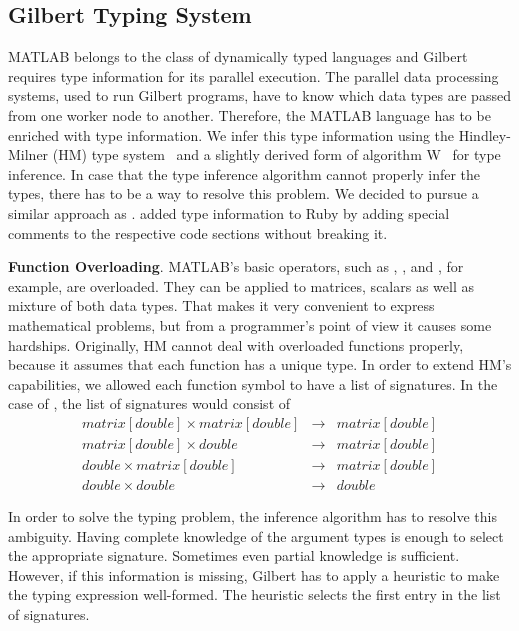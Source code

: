 \subsection{Gilbert Typing System}
\label{sec:gilberttyping}

MATLAB belongs to the class of dynamically typed languages and Gilbert requires type information for its parallel execution.
The parallel data processing systems, used to run Gilbert programs, have to know which data types are passed from one worker node to another.
Therefore, the MATLAB language has to be enriched with type information. We infer this type information using the Hindley-Milner (HM) type system~\cite{hindley:tams1969a,milner:jcss1978a} and a slightly derived form of algorithm W~\cite{damas:1982a} for type inference. In case that the type inference algorithm cannot properly infer the types, there has to be a way to resolve this problem. We decided to pursue a similar approach as \cite{furr:2009a}. \cite{furr:2009a} added type information to Ruby by adding special comments to the respective code sections without breaking it.


\textbf{Function Overloading}. MATLAB's basic operators, such as \code{+}, \code{-}, \code{/} and \code{*}, for example, are overloaded.
They can be applied to matrices, scalars as well as mixture of both data types.
That makes it very convenient to express mathematical problems, but from a programmer's point of view it causes some hardships.
Originally, HM cannot deal with overloaded functions properly, because it assumes that each function has a unique type.
In order to extend HM's capabilities, we allowed each function symbol to have a list of signatures.
In the case of \code{+}, the list of signatures would consist of 
\begin{eqnarray*}
matrix[double] \times matrix[double] &\rightarrow& matrix[double]\\
matrix[double] \times double &\rightarrow& matrix[double]\\
double \times matrix[double] &\rightarrow& matrix[double]\\
double \times double &\rightarrow& double
\end{eqnarray*}

In order to solve the typing problem, the inference algorithm has to resolve this ambiguity.
Having complete knowledge of the argument types is enough to select the appropriate signature.
Sometimes even partial knowledge is sufficient.
However, if this information is missing, Gilbert has to apply a heuristic to make the typing expression well-formed.
The heuristic selects the first entry in the list of signatures.

